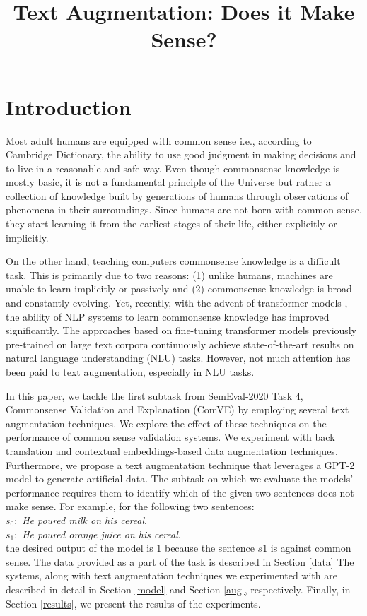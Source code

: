 \documentclass[10pt, a4paper]{article}
\title{Text Augmentation: Does it Make Sense?}
\begin{document}
\maketitleabstract

\section{Introduction}

Most adult humans are equipped with common sense i.e., according to Cambridge Dictionary, the ability to use good judgment in making decisions and to live in a reasonable and safe way. Even though commonsense knowledge is mostly basic, it is not a fundamental principle of the Universe but rather a collection of knowledge built by generations of humans through observations of phenomena in their surroundings. Since humans are not born with common sense, they start learning it from the earliest stages of their life, either explicitly or implicitly.

On the other hand, teaching computers commonsense knowledge is a difficult task. This is primarily due to two reasons: (1) unlike humans, machines are unable to learn implicitly or passively and (2) commonsense knowledge is broad and constantly evolving. Yet, recently, with the advent of transformer models \citep{transformers}, the ability of NLP systems to learn commonsense knowledge has improved significantly. The approaches based on fine-tuning transformer models previously pre-trained on large text corpora continuously achieve state-of-the-art results on natural language understanding (NLU) tasks. However, not much attention has been paid to text augmentation, especially in NLU tasks.

In this paper, we tackle the first subtask from SemEval-2020 Task 4, Commonsense Validation and Explanation (ComVE) \citep{wang-etal-2020-semeval} by employing several text augmentation techniques. We explore the effect of these techniques on the performance of common sense validation systems. We experiment with back translation and contextual embeddings-based data augmentation techniques. Furthermore, we propose a text augmentation technique that leverages a GPT-2 model \citep{radford2019language} to generate artificial data. The subtask on which we evaluate the models' performance requires them to identify which of the given two sentences does not make sense. For example, for the following two sentences:\\
$s_0:$ \textit{He poured milk on his cereal}.\\
$s_1:$ \textit{He poured orange juice on his cereal}.\\
the desired output of the model is $1$ because the sentence $s1$ is against common sense. The data provided as a part of the task is described in Section \ref{data} The systems, along with text augmentation techniques we experimented with are described in detail in Section \ref{model} and Section \ref{aug}, respectively. Finally, in Section \ref{results}, we present the results of the experiments.
\end{document}

